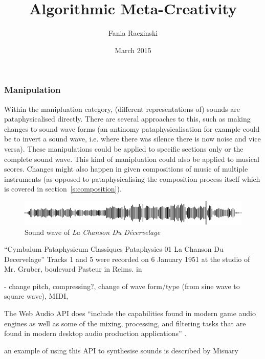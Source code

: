 \documentclass[11pt]{thesis} %
\title{Algorithmic Meta-Creativity}
\author{Fania Raczinski}
\date{March 2015}
\begin{document}
\subsubsection{Manipulation}

Within the manipluation category, (different representations of) sounds are pataphysicalised directly. There are several approaches to this, such as making changes to sound wave forms (an antinomy pataphysicalisation for example could be to invert a sound wave, i.e. where there was silence there is now noise and vice versa). These manipulations could be applied to specific sections only or the complete sound wave. This kind of manipluation could also be applied to musical scores. Changes might also happen in given compositions of music of multiple instruments (as opposed to pataphysicalising the composition process itself which is covered in section~\ref{s:composition}).

\begin{figure}[!htbp]
\centering
  \includegraphics[width=\linewidth]{simplewave.pdf}
\caption[Sound wave of \textit{La Chanson Du D{\'e}cervelage}]{Sound wave of \textit{La Chanson Du D{\'e}cervelage} \autocite[][Track 1]{UbuWebPata}}
\end{figure}

``Cymbalum Pataphysicum Classiques Pataphysics 01 La Chanson Du Decervelage''
Tracks 1 and 5 were recorded on 6 January 1951 at the studio of Mr. Gruber, boulevard Pasteur in Reims.
in \autocite[][Track 1]{UbuWebPata}




- change pitch, compressing?, change of wave form/type (from sine wave to square wave), MIDI,  




The Web Audio API does ``include the capabilities found in modern game audio engines as well as some of the mixing, processing, and filtering tasks that are found in modern desktop audio production applications'' \autocite{Adenot2017}.

an example of using this API to synthesise sounds is described by Misuary \autocite{Misuary2016}



\autocite{soundcloud}


\end{document}
